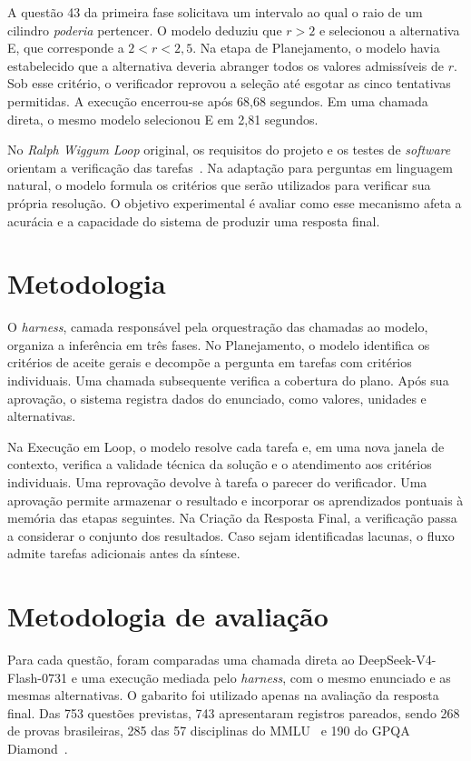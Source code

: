 \documentclass[a4paper,10pt, twocolumn]{article}
\begin{document}
A questão 43 da primeira fase solicitava um intervalo ao qual o raio de um cilindro \emph{poderia} pertencer. O modelo deduziu que $r>2$ e selecionou a alternativa E, que corresponde a \mbox{$2<r<2{,}5$}. Na etapa de Planejamento, o modelo havia estabelecido que a alternativa deveria abranger todos os valores admissíveis de $r$. Sob esse critério, o verificador reprovou a seleção até esgotar as cinco tentativas permitidas. A execução encerrou-se após 68,68 segundos. Em uma chamada direta, o mesmo modelo selecionou E em 2,81 segundos.

No \textit{Ralph Wiggum Loop} original, os requisitos do projeto e os testes de \textit{software} orientam a verificação das tarefas~\cite{huntley}. Na adaptação para perguntas em linguagem natural, o modelo formula os critérios que serão utilizados para verificar sua própria resolução. O objetivo experimental é avaliar como esse mecanismo afeta a acurácia e a capacidade do sistema de produzir uma resposta final.

\newpage
\section{Metodologia}

O \textit{harness}, camada responsável pela orquestração das chamadas ao modelo, organiza a inferência em três fases. No Planejamento, o modelo identifica os critérios de aceite gerais e decompõe a pergunta em tarefas com critérios individuais. Uma chamada subsequente verifica a cobertura do plano. Após sua aprovação, o sistema registra dados do enunciado, como valores, unidades e alternativas.

Na Execução em Loop, o modelo resolve cada tarefa e, em uma nova janela de contexto, verifica a validade técnica da solução e o atendimento aos critérios individuais. Uma reprovação devolve à tarefa o parecer do verificador. Uma aprovação permite armazenar o resultado e incorporar os aprendizados pontuais à memória das etapas seguintes. Na Criação da Resposta Final, a verificação passa a considerar o conjunto dos resultados. Caso sejam identificadas lacunas, o fluxo admite tarefas adicionais antes da síntese.

\section{Metodologia de avaliação}

Para cada questão, foram comparadas uma chamada direta ao DeepSeek-V4-Flash-0731 e uma execução mediada pelo \textit{harness}, com o mesmo enunciado e as mesmas alternativas. O gabarito foi utilizado apenas na avaliação da resposta final. Das 753 questões previstas, 743 apresentaram registros pareados, sendo 268 de provas brasileiras, 285 das 57 disciplinas do MMLU~\cite{mmlu} e 190 do GPQA Diamond~\cite{gpqa}.
\end{document}
